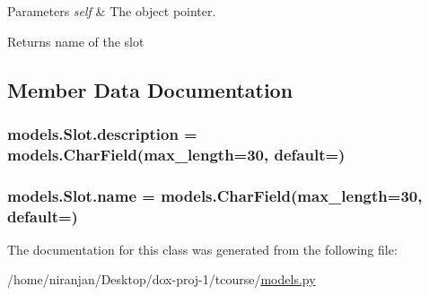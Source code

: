 \begin{DoxyParams}{Parameters}
{\em self} & The object pointer. \\
\hline
\end{DoxyParams}
\begin{DoxyReturn}{Returns}
name of the slot 
\end{DoxyReturn}


\subsection{Member Data Documentation}
\subsubsection[{\texorpdfstring{description}{description}}]{\setlength{\rightskip}{0pt plus 5cm}models.\+Slot.\+description = models.\+Char\+Field(max\+\_\+length=30, default=\textquotesingle{}\textquotesingle{})\hspace{0.3cm}{\ttfamily [static]}}\hypertarget{classmodels_1_1_slot_a2670282b6a7ea6b489c43c2d68a789d2}{}\label{classmodels_1_1_slot_a2670282b6a7ea6b489c43c2d68a789d2}
\subsubsection[{\texorpdfstring{name}{name}}]{\setlength{\rightskip}{0pt plus 5cm}models.\+Slot.\+name = models.\+Char\+Field(max\+\_\+length=30, default=\textquotesingle{}\textquotesingle{})\hspace{0.3cm}{\ttfamily [static]}}\hypertarget{classmodels_1_1_slot_ac8be38c6772631ddfb7c5fda92b6da80}{}\label{classmodels_1_1_slot_ac8be38c6772631ddfb7c5fda92b6da80}


The documentation for this class was generated from the following file\+:\begin{DoxyCompactItemize}
\item 
/home/niranjan/\+Desktop/dox-\/proj-\/1/tcourse/\hyperlink{models_8py}{models.\+py}\end{DoxyCompactItemize}
